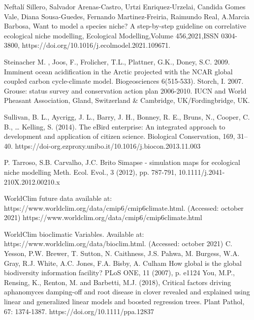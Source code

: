 \documentclass[12pt,a4paper]{article}
\begin{document}
\begin{thebibliography}{999}
Neftalí Sillero, Salvador Arenas-Castro, Urtzi Enriquez‐Urzelai, Candida Gomes Vale, Diana Sousa-Guedes, Fernando Martinez-Freiria, Raimundo Real, A.Marcia Barbosa,
Want to model a species niche? A step-by-step guideline on correlative ecological niche modelling,
Ecological Modelling,Volume 456,2021,ISSN 0304-3800, https://doi.org/10.1016/j.ecolmodel.2021.109671.


Steinacher M. , Joos, F., Frolicher, T.L., Plattner, G.K., Doney, S.C. 2009. Imminent ocean acidification in the Arctic projected with the NCAR global coupled carbon cycle-climate model. Biogeosciences 6(515-533).
Storch, I. 2007. Grouse: status survey and conservation action plan 2006-2010. IUCN and World Pheasant Association, Gland, Switzerland \& Cambridge, UK/Fordingbridge, UK.

Sullivan, B. L., Aycrigg, J. L., Barry, J. H., Bonney, R. E., Bruns, N., Cooper, C. B., … Kelling, S. (2014). The eBird enterprise: An integrated approach to development and application of citizen science. Biological Conservation, 169, 31– 40. https://doi-org.ezproxy.unibo.it/10.1016/j.biocon.2013.11.003

P. Tarroso, S.B. Carvalho, J.C. Brito
Simapse - simulation maps for ecological niche modelling
Meth. Ecol. Evol., 3 (2012), pp. 787-791, 10.1111/j.2041-210X.2012.00210.x

WorldClim future data available at: https://www.worldclim.org/data/cmip6/cmip6climate.html. (Accessed: october 2021)
https://www.worldclim.org/data/cmip6/cmip6climate.html

WorldClim bioclimatic Variables. Available at: https://www.worldclim.org/data/bioclim.html. (Accessed: october 2021)
C. Yesson, P.W. Brewer, T. Sutton, N. Caithness, J.S. Pahwa, M. Burgess, W.A. Gray, R.J. White, A.C. Jones, F.A. Bisby, A. Culham
How global is the global biodiversity information facility?
PLoS ONE, 11 (2007), p. e1124
You, M.P., Rensing, K., Renton, M. and Barbetti, M.J. (2018), Critical factors driving aphanomyces damping-off and root disease in clover revealed and explained using linear and generalized linear models and boosted regression trees. Plant Pathol, 67: 1374-1387. https://doi.org/10.1111/ppa.12837


\end{thebibliography}
\end{document}
